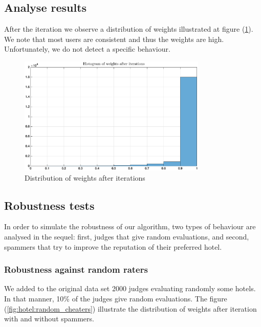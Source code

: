 \documentclass[12pt,a4paper]{article}
\begin{document}
\subsection{Analyse results} 

After the iteration we observe a distribution of weights illustrated at figure (\ref{fig:hotel:initial_weights}). We note that most users are consistent and thus the weights are high. Unfortunately, we do not detect a specific behaviour.

\begin{figure}[!h]
\centering
\includegraphics[width = 0.8\textwidth]{hotels/initial_weights.eps}
\caption{\label{fig:hotel:initial_weights} Distribution of weights after iterations}
\end{figure}

\subsection{Robustness tests}

In order to simulate the robustness of our algorithm, two types of behaviour are analysed in the sequel: first, judges that give random evaluations, and second, spammers that try to improve the reputation of their preferred hotel.

\subsubsection*{Robustness against random raters}
We added to the original data set 2000 judges evaluating randomly some hotels. In that manner, 10\% of the judges give random evaluations. The figure (\ref{fig:hotel:random_cheaters}) illustrate the distribution of weights after iteration with and without spammers.
\end{document}
